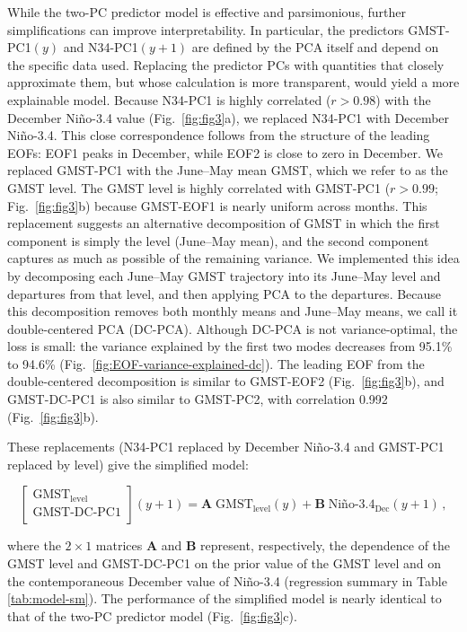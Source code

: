 \documentclass[draft]{agujournal2019}
\begin{document}
While the two-PC predictor model is effective and parsimonious, further simplifications can improve interpretability. In particular, the predictors GMST-PC1$(y)$ and N34-PC1$(y+1)$ are defined by the PCA itself and depend on the specific data used. Replacing the predictor PCs with quantities that closely approximate them, but whose calculation is more transparent, would yield a more explainable model. Because N34-PC1 is highly correlated ($r>0.98$) with the December Ni\~no-3.4 value (Fig.\ \ref{fig:fig3}a), we replaced N34-PC1 with December Ni\~no-3.4. This close correspondence follows from the structure of the leading EOFs: EOF1 peaks in December, while EOF2 is close to zero in December. We replaced GMST-PC1 with the June--May mean GMST, which we refer to as the GMST level. The GMST level is highly correlated with GMST-PC1 ($r>0.99$; Fig.\ \ref{fig:fig3}b) because GMST-EOF1 is nearly uniform across months. This replacement suggests an alternative decomposition of GMST in which the first component is simply the level (June--May mean), and the second component captures as much as possible of the remaining variance. We implemented this idea by decomposing each June--May GMST trajectory into its June--May level and departures from that level, and then applying PCA to the departures. Because this decomposition removes both monthly means and June--May means, we call it double-centered PCA (DC-PCA). Although DC-PCA is not variance-optimal, the loss is small: the variance explained by the first two modes decreases from 95.1\% to 94.6\% (Fig.\ \ref{fig:EOF-variance-explained-dc}). The leading EOF from the double-centered decomposition is similar to GMST-EOF2 (Fig.\ \ref{fig:fig3}b), and GMST-DC-PC1 is also similar to GMST-PC2, with correlation 0.992 (Fig.\ \ref{fig:fig3}b).

These replacements (N34-PC1 replaced by December Ni\~no-3.4 and GMST-PC1 replaced by level) give the simplified model: \begin{linenomath*}
\begin{equation} \begin{bmatrix} \text{GMST}_{\text{level}}\\ \text{GMST-DC-PC1}\\ \end{bmatrix}(y+1) = \bm{A} \; \text{GMST}_{\text{level}} (y) + \bm{B} \; \text{Ni\~no-3.4}_{\text{Dec}} (y+1)\,, \label{eq:simplified} \end{equation}
\end{linenomath*} where the $2 \times 1$ matrices $\bm{A}$ and $\bm{B}$ represent, respectively, the dependence of the GMST level and GMST-DC-PC1 on the prior value of the GMST level and on the contemporaneous December value of Ni\~no-3.4 (regression summary in Table \ref{tab:model-sm}). The performance of the simplified model is nearly identical to that of the two-PC predictor model (Fig.\ \ref{fig:fig3}c).
\end{document}
